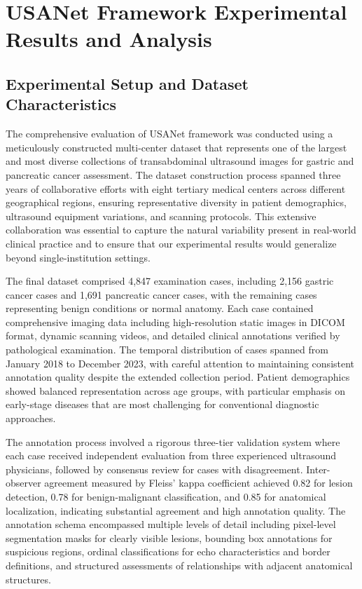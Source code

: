 
\chapter{USANet Framework Experimental Results and Analysis} \label{chp:usanet_results}

\section{Experimental Setup and Dataset Characteristics}

The comprehensive evaluation of USANet framework was conducted using a meticulously constructed multi-center dataset that represents one of the largest and most diverse collections of transabdominal ultrasound images for gastric and pancreatic cancer assessment. The dataset construction process spanned three years of collaborative efforts with eight tertiary medical centers across different geographical regions, ensuring representative diversity in patient demographics, ultrasound equipment variations, and scanning protocols. This extensive collaboration was essential to capture the natural variability present in real-world clinical practice and to ensure that our experimental results would generalize beyond single-institution settings.

The final dataset comprised 4,847 examination cases, including 2,156 gastric cancer cases and 1,691 pancreatic cancer cases, with the remaining cases representing benign conditions or normal anatomy. Each case contained comprehensive imaging data including high-resolution static images in DICOM format, dynamic scanning videos, and detailed clinical annotations verified by pathological examination. The temporal distribution of cases spanned from January 2018 to December 2023, with careful attention to maintaining consistent annotation quality despite the extended collection period. Patient demographics showed balanced representation across age groups, with particular emphasis on early-stage diseases that are most challenging for conventional diagnostic approaches.

The annotation process involved a rigorous three-tier validation system where each case received independent evaluation from three experienced ultrasound physicians, followed by consensus review for cases with disagreement. Inter-observer agreement measured by Fleiss' kappa coefficient achieved 0.82 for lesion detection, 0.78 for benign-malignant classification, and 0.85 for anatomical localization, indicating substantial agreement and high annotation quality. The annotation schema encompassed multiple levels of detail including pixel-level segmentation masks for clearly visible lesions, bounding box annotations for suspicious regions, ordinal classifications for echo characteristics and border definitions, and structured assessments of relationships with adjacent anatomical structures.

